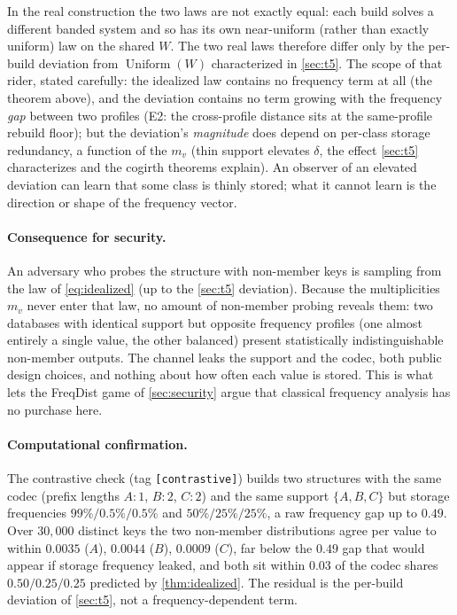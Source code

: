 \documentclass[acmsmall,review]{acmart}
\DeclareMathOperator{\Uniform}{Uniform}
\newcommand{\W}{W}                          %
\begin{document}
In the real construction the two laws are not exactly equal: each build solves a
different banded system and so has its own near-uniform (rather than exactly uniform)
law on the shared $\W$. The two real laws therefore differ only by the per-build
deviation from $\Uniform(\W)$ characterized in \cref{sec:t5}. The scope of that rider,
stated carefully: the idealized law contains no frequency term at all (the theorem
above), and the deviation contains no term growing with the frequency \emph{gap}
between two profiles (E2: the cross-profile distance sits at the same-profile rebuild
floor); but the deviation's \emph{magnitude} does depend on per-class storage
redundancy, a function of the $m_v$ (thin support elevates $\delta$, the effect
\cref{sec:t5} characterizes and the cogirth theorems explain). An observer of an
elevated deviation can learn that some class is thinly stored; what it cannot learn is
the direction or shape of the frequency vector.

\paragraph{Consequence for security.}
An adversary who probes the structure with non-member keys is sampling from the law of
\eqref{eq:idealized} (up to the \cref{sec:t5} deviation). Because the multiplicities
$m_v$ never enter that law, no amount of non-member probing reveals them: two databases
with identical support but opposite frequency profiles (one almost entirely a single
value, the other balanced) present statistically indistinguishable non-member outputs.
The channel leaks the support and the codec, both public design choices, and nothing
about how often each value is stored. This is what lets the FreqDist game of
\cref{sec:security} argue that classical frequency analysis has no purchase here.

\paragraph{Computational confirmation.}
The contrastive check (tag \texttt{[contrastive]}) builds two structures with the same
codec (prefix lengths $A{:}1$, $B{:}2$, $C{:}2$) and the same support $\{A,B,C\}$ but
storage frequencies $99\% / 0.5\% / 0.5\%$ and $50\% / 25\% / 25\%$, a raw frequency
gap up to $0.49$. Over $30{,}000$ distinct keys the two non-member distributions agree
per value to within $0.0035$ ($A$), $0.0044$ ($B$), $0.0009$ ($C$), far below the
$0.49$ gap that would appear if storage frequency leaked, and both sit within $0.03$ of
the codec shares $0.50 / 0.25 / 0.25$ predicted by \cref{thm:idealized}. The residual
is the per-build deviation of \cref{sec:t5}, not a frequency-dependent term.
\end{document}
